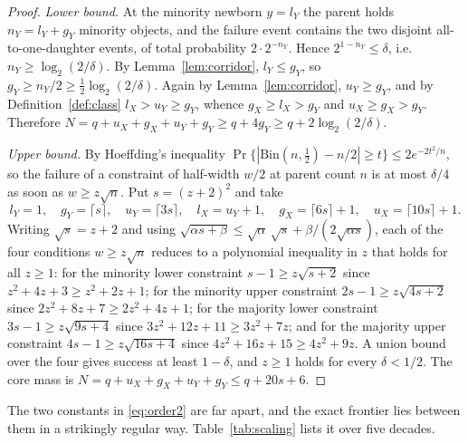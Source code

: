 \documentclass[11pt]{article}
\theoremstyle{plain}
\theoremstyle{definition}
\theoremstyle{remark}
\newcommand{\Bin}{\mathrm{Bin}}
\begin{document}
\begin{proof}
\emph{Lower bound.} At the minority newborn $y=l_Y$ the parent holds
$n_Y=l_Y+g_Y$ minority objects, and the failure event contains the two
disjoint all-to-one-daughter events, of total probability $2\cdot2^{-n_Y}$.
Hence $2^{1-n_Y}\le\delta$, i.e.\ $n_Y\ge\log_2(2/\delta)$. By
Lemma~\ref{lem:corridor}, $l_Y\le g_Y$, so $g_Y\ge n_Y/2\ge
\frac12\log_2(2/\delta)$. Again by Lemma~\ref{lem:corridor},
$u_Y\ge g_Y$, and by Definition~\ref{def:class} $l_X>u_Y\ge g_Y$, whence
$g_X\ge l_X>g_Y$ and $u_X\ge g_X>g_Y$. Therefore
$N=q+u_X+g_X+u_Y+g_Y\ge q+4g_Y\ge q+2\log_2(2/\delta)$.

\emph{Upper bound.} By Hoeffding's inequality \cite{hoeffding1963}
$\Pr\{|\Bin(n,\frac12)-n/2|\ge t\}\le2e^{-2t^{2}/n}$, so the failure of a
constraint of half-width $w/2$ at parent count $n$ is at most $\delta/4$ as
soon as $w\ge z\sqrt{n}$. Put $s=(z+2)^{2}$ and take
\[
l_Y=1,\quad g_Y=\lceil s\rceil,\quad u_Y=\lceil3s\rceil,\quad
l_X=u_Y+1,\quad g_X=\lceil6s\rceil+1,\quad u_X=\lceil10s\rceil+1 .
\]
Writing $\sqrt{s}=z+2$ and using $\sqrt{\alpha s+\beta}\le
\sqrt{\alpha}\,\sqrt s+\beta/(2\sqrt{\alpha s})$, each of the four conditions
$w\ge z\sqrt{n}$ reduces to a polynomial inequality in $z$ that holds for all
$z\ge1$: for the minority lower constraint $s-1\ge z\sqrt{s+2}$ since
$z^{2}+4z+3\ge z^{2}+2z+1$; for the minority upper constraint
$2s-1\ge z\sqrt{4s+2}$ since $2z^{2}+8z+7\ge2z^{2}+4z+1$; for the majority
lower constraint $3s-1\ge z\sqrt{9s+4}$ since $3z^{2}+12z+11\ge3z^{2}+7z$;
and for the majority upper constraint $4s-1\ge z\sqrt{16s+4}$ since
$4z^{2}+16z+15\ge4z^{2}+9z$. A union bound over the four gives success at
least $1-\delta$, and $z\ge1$ holds for every $\delta<1/2$. The core mass is
$N=q+u_X+g_X+u_Y+g_Y\le q+20s+6$. \end{proof}

The two constants in \eqref{eq:order2} are far apart, and the exact frontier
lies between them in a strikingly regular way. Table~\ref{tab:scaling} lists
it over five decades.
\end{document}
